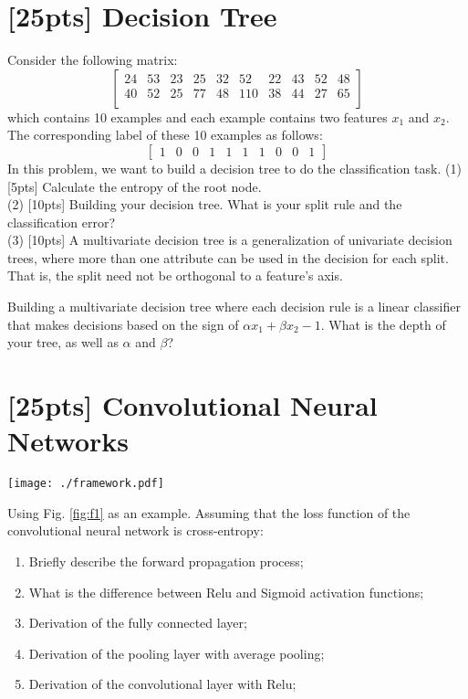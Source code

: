 \documentclass{article}
\begin{document}
	\section{[25pts] {Decision Tree}}
	Consider the following matrix:
	$$
	\left[
	\begin{matrix}
	24 & 53 & 23 & 25 & 32 & 52 & 22 & 43 & 52 & 48 \\
	40 & 52 & 25 & 77 & 48 & 110 & 38 & 44 & 27 & 65\\
	\end{matrix}
	\right]
	$$
	which contains 10 examples and each example contains two features $x_1$ and $x_2$. The corresponding label of these 10 examples as follows:
	$$
	\left[
	\begin{matrix}
	1 & 0 & 0 &1 & 1 & 1 & 1& 0 & 0 & 1
	\end{matrix}
	\right]
	$$
	In this problem, we want to build a decision tree to do the classification task.
	(1) [5pts] Calculate the entropy of the root node.\\
	(2) [10pts] Building your decision tree. What is your split rule  and the classification error?\\
	(3) [10pts] A multivariate decision tree is a generalization of  univariate decision trees, where more than one attribute can be used in the decision for each split. That is, the split need not be orthogonal to a feature's axis.
	
	Building a multivariate decision tree where each decision rule is a linear classifier that makes decisions based on the sign of $\alpha x_1 + \beta x_2 - 1$. What is the depth of your tree, as well as $\alpha$ and $\beta$?
	
	
	
	\vspace{3cm}
	
	
	\section{[25pts] Convolutional Neural Networks}
    \begin{figure*}[h]
    \centering
    \texttt{[image: ./framework.pdf]}
    \caption{CNN.}\label{fig:f1}
    \end{figure*}
    
    Using Fig. \ref{fig:f1} as an example. Assuming that the loss function of the convolutional neural network is cross-entropy:
    
    \begin{enumerate}
    	\item [(1)] [5 pts] Briefly describe the forward propagation process;
    	\item [(2)] [5 pts] What is the difference between Relu and Sigmoid activation functions;
		\item [(3)] [5 pts] Derivation of the fully connected layer;
   		\item [(4)] [5 pts] Derivation of the pooling layer with average pooling;
    	\item [(5)] [5 pts] Derivation of the convolutional layer with Relu;
    \end{enumerate}
	
\end{document}
